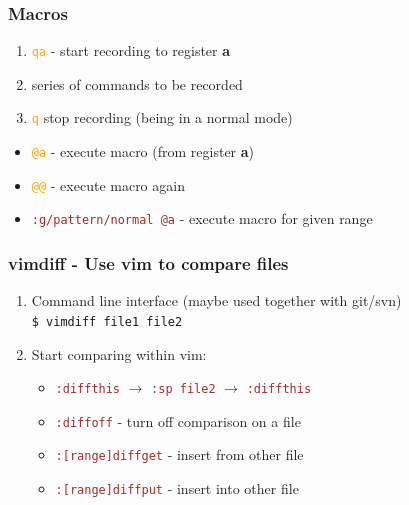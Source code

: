 \documentclass{beamer}
\newcommand{\vimnormal}[1]{\texttt{\textcolor{orange}{#1}}}
\newcommand{\vimcommand}[1]{\texttt{\textcolor{brown}{#1}}}
\begin{document}
\begin{frame}
    \frametitle{Macros}
    \begin{enumerate}
        \item \vimnormal{qa} - start recording to register \textbf{a}
        \item series of commands to be recorded
        \item \vimnormal{q} stop recording (being in a normal mode)
    \end{enumerate}
    \begin{itemize}
        \item \vimnormal{@a} - execute macro (from register \textbf{a})
        \item \vimnormal{@@} - execute macro again
        \item \vimcommand{:g/pattern/normal @a} - execute macro for given range
    \end{itemize}
\end{frame}

\begin{frame}
    \frametitle{vimdiff - Use vim to compare files}
    \begin{enumerate}
      \item Command line interface (maybe used together with git/svn)\\
        \texttt{\$ vimdiff file1 file2}
      \item Start comparing within vim:
          \begin{itemize}
            \item \vimcommand{:diffthis} $\rightarrow$ \vimcommand{:sp file2} $\rightarrow$ \vimcommand{:diffthis}
            \item \vimcommand{:diffoff} - turn off comparison on a file
            \item \vimcommand{:[range]diffget} - insert from other file
            \item \vimcommand{:[range]diffput} - insert into other file
          \end{itemize}
    \end{enumerate}
\end{frame}
\end{document}
